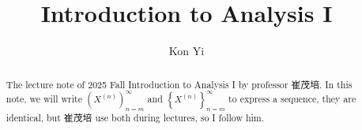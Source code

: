 \documentclass[a4paper]{report}
\author{Kon Yi}
\title{Introduction to Analysis I}
\begin{document}
\maketitle

\begin{abstract}
    The lecture note of 2025 Fall Introduction to Analysis I by professor 崔茂培. In this note, we will write \(\left( X^{(n)} \right)_{n=m}^{\infty}  \) and \(\left\{ X^{(n)} \right\}_{n=m}^{\infty}  \) to express a sequence, they are identical, but 崔茂培 use both during lectures, so I follow him.  
\end{abstract}

\newpage

\tableofcontents


\newpage
\appendix
\appendixpage{}



\newpage
\pagestyle{plain}
\printbibliography{}
\end{document}
